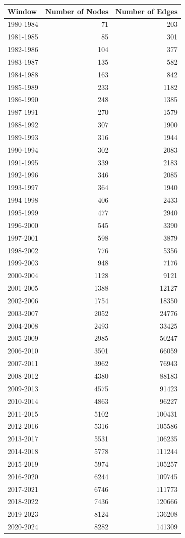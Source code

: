 \documentclass[
]{article}
\begin{document}
\begin{table}[!h]
\centering
\begin{tabular}{lrr}
\toprule
Window & Number of Nodes & Number of Edges\\
\midrule
1980-1984 & 71 & 203\\
1981-1985 & 85 & 301\\
1982-1986 & 104 & 377\\
1983-1987 & 135 & 582\\
1984-1988 & 163 & 842\\
1985-1989 & 233 & 1182\\
1986-1990 & 248 & 1385\\
1987-1991 & 270 & 1579\\
1988-1992 & 307 & 1900\\
1989-1993 & 316 & 1944\\
1990-1994 & 302 & 2083\\
1991-1995 & 339 & 2183\\
1992-1996 & 346 & 2085\\
1993-1997 & 364 & 1940\\
1994-1998 & 406 & 2433\\
1995-1999 & 477 & 2940\\
1996-2000 & 545 & 3390\\
1997-2001 & 598 & 3879\\
1998-2002 & 776 & 5356\\
1999-2003 & 948 & 7176\\
2000-2004 & 1128 & 9121\\
2001-2005 & 1388 & 12127\\
2002-2006 & 1754 & 18350\\
2003-2007 & 2052 & 24776\\
2004-2008 & 2493 & 33425\\
2005-2009 & 2985 & 50247\\
2006-2010 & 3501 & 66059\\
2007-2011 & 3962 & 76943\\
2008-2012 & 4380 & 88183\\
2009-2013 & 4575 & 91423\\
2010-2014 & 4863 & 96227\\
2011-2015 & 5102 & 100431\\
2012-2016 & 5316 & 105586\\
2013-2017 & 5531 & 106235\\
2014-2018 & 5778 & 111244\\
2015-2019 & 5974 & 105257\\
2016-2020 & 6244 & 109745\\
2017-2021 & 6746 & 111773\\
2018-2022 & 7436 & 120666\\
2019-2023 & 8124 & 136208\\
2020-2024 & 8282 & 141309\\
\bottomrule
\end{tabular}
\end{table}
\end{document}
